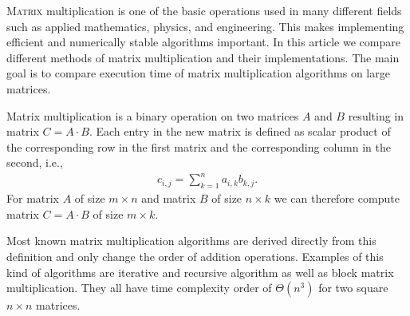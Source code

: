 \documentclass[a4paper,11pt]{article}
\begin{document}
\lettrine{M}{atrix} multiplication
is one of the basic operations used in many different fields such 
as applied mathematics, physics, and engineering.
This makes implementing efficient and numerically stable algorithms important. 
In this article we compare different methods of matrix multiplication and their implementations. 
The main goal is to compare execution time of matrix multiplication algorithms on large matrices.








Matrix multiplication is a binary operation on two matrices 
$A$ and $B$ resulting in matrix $C=A \cdot B$. Each entry in the new matrix is defined as scalar product of the corresponding row in the first matrix and the corresponding column in the second, i.e.,
\begin{align*}
c_{i,j} = \sum_{k=1}^{n} a_{i,k} b_{k,j}.
\end{align*}
For matrix $A$ of size $m \times n$ and matrix $B$ of size $n \times k$ we can therefore compute matrix $C= A \cdot B$ of size $m \times k$.

Most known matrix multiplication algorithms are derived directly from this definition and only change the order of addition operations. 
Examples of this kind of algorithms are iterative and recursive algorithm as well as block matrix multiplication.
They all have time complexity order of $\Theta(n^3)$ for two square $n \times n$ matrices.
\end{document}
